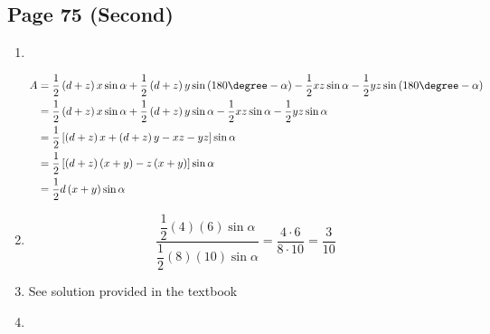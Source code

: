 \documentclass{article}
\newenvironment{solutions}[1]
{\subsection*{#1}
 \begin{enumerate}[leftmargin=1.5em]}
{\end{enumerate}}
\newcommand{\solution}{\item}
\begin{document}
\begin{solutions}{Page 75 (Second)}
$w+y$ and $x+z$ are the lengths of the diagonals in the quadrilateral in the diagram above. The above derivation shows that the choice of $\alpha$ does not matter since $\sin{\alpha}=\sin\left(180\degree-\alpha\right)$.

\solution ~ %
\begin{center}
\end{center}

\begin{align*}
A &= \dfrac{1}{2}\left(d+z\right)x\sin{\alpha} + \dfrac{1}{2}\left(d+z\right)y\sin\left(180\degree-\alpha\right) - \dfrac{1}{2}xz\sin{\alpha} - \dfrac{1}{2}yz\sin\left(180\degree-\alpha\right) \\
&= \dfrac{1}{2}\left(d+z\right)x\sin{\alpha} + \dfrac{1}{2}\left(d+z\right)y\sin{\alpha} - \dfrac{1}{2}xz\sin{\alpha} - \dfrac{1}{2}yz\sin{\alpha} \\
&= \dfrac{1}{2}\left[\left(d+z\right)x  + \left(d+z\right)y - xz - yz\right]\sin{\alpha} \\
&= \dfrac{1}{2}\left[\left(d+z\right)\left(x+y\right) - z\left(x+y\right)\right]\sin{\alpha} \\
&= \dfrac{1}{2}d\left(x+y\right)\sin{\alpha}
\end{align*}

\solution %
\[
\dfrac{\dfrac{1}{2}\left(4\right)\left(6\right)\sin{\alpha}}{\dfrac{1}{2}\left(8\right)\left(10\right)\sin{\alpha}} = \dfrac{4 \cdot 6}{8 \cdot 10} = \dfrac{3}{10}
\]

\solution %
See solution provided in the textbook

\solution ~ %
\begin{center}
\end{center}
\end{solutions}
\end{document}
